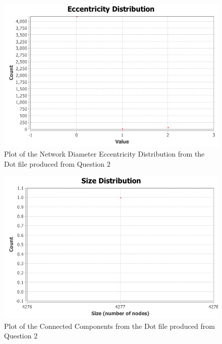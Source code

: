 \documentclass[letterpaper,11pt]{article}
\begin{document}
\begin{figure}[p]
\includegraphics[scale=0.5]{"q3/Network-Diameter/Eccentricity Distribution"}
\caption{Plot of the Network Diameter Eccentricity Distribution from the Dot file produced from Question 2}
\label{fig:q3netdiam-eccentricity}
\end{figure}

\begin{figure}[p]
\includegraphics[scale=0.5]{q3/Connected-Components/cc-size-distribution.png}
\caption{Plot of the Connected Components from the Dot file produced from Question 2}
\label{fig:q3cc}
\end{figure}

\clearpage


\end{document}
